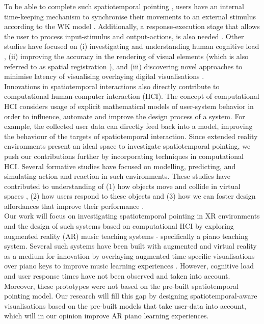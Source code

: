 \documentclass[manuscript,screen]{acmart}
\begin{document}
To be able to complete such spatiotemporal pointing \cite{lee2016modelling}, users have an internal time-keeping mechanism to synchronise their movements to an external stimulus according to the WK model \cite{wing1973response}. Additionally, a response-execution stage that allows the user to process input-stimulus and output-actions, is also needed \cite{wing1973timing}. Other studies have focused on (i) investigating and understanding human cognitive load \cite{radu2009augmented}, (ii) improving the accuracy in the rendering of visual elements (which is also referred to as spatial registration \cite{zheng2013general}), and (iii) discovering novel approaches to minimise latency of visualising overlaying digital visualisations \cite{serafin2017considerations}. \\

Innovations in spatiotemporal interactions also directly contribute to computational human-computer interaction (HCI). The concept of computational HCI considers usage of explicit mathematical models of user-system behavior in order to influence, automate and improve the design process of a system. For example, the collected user data can directly feed back into a model, improving the behaviour of the targets of spatiotemporal interaction. Since extended reality environments present an ideal space to investigate spatiotemporal pointing, we push our contributions further by incorporating techniques in computational HCI. Several formative studies have focused on modelling, predicting, and simulating action and reaction in such environments. These studies have contributed to understanding of (1) how objects move and collide in virtual spaces \cite{lee2017boxer}, (2) how users respond to these objects \cite{lee2016modelling} and (3) how we can foster design affordances that improve their performance \cite{rogers2014piano}.\\

Our work will focus on investigating spatiotemporal pointing in XR environments and the design of such systems based on computational HCI by exploring augmented reality (AR) music teaching systems - specifically a piano teaching system. Several such systems have been built with augmented and virtual reality as a medium for innovation by overlaying augmented time-specific visualisations over piano keys to improve music learning experiences \cite{rogers2014piano, sun2018mr, birhanu2017keynvision}. However, cognitive load and user response times have not been observed and taken into account. Moreover, these prototypes were not based on the pre-built spatiotemporal pointing model. Our research will fill this gap by designing spatiotemporal-aware visualisations based on the pre-built models that take user-data into account, which will in our opinion improve  AR piano learning experiences. \\
\end{document}
